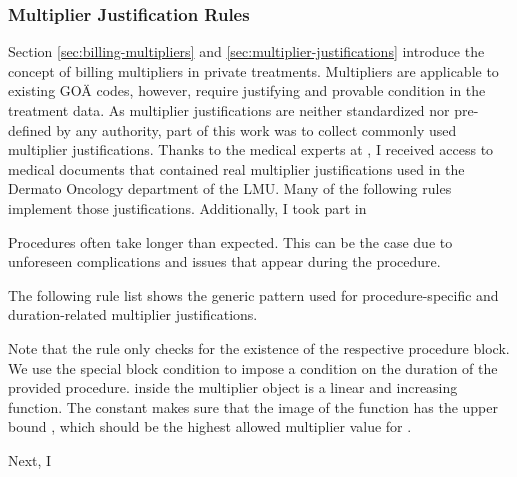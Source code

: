 \subsubsection{Multiplier Justification Rules}\label{subsec:multiplier-justification-rules}
Section \ref{sec:billing-multipliers} and \ref{sec:multiplier-justifications} introduce the concept of billing multipliers in private treatments.
Multipliers are applicable to existing GOÄ codes, however, require justifying and provable condition in the treatment data.
As multiplier justifications are neither standardized nor pre-defined by any authority,
part of this work was to collect commonly used multiplier justifications.
Thanks to the medical experts at \AV, I received access to medical documents that contained real multiplier justifications used in the Dermato Oncology department of the LMU.
Many of the following rules implement those justifications.
Additionally, I took part in 


Procedures often take longer than expected.
This can be the case due to unforeseen complications and issues that appear during the procedure.

The following rule list shows the generic pattern used for procedure-specific and duration-related multiplier justifications.



Note that the rule only checks for the existence of the respective procedure block.
We use the special block condition  to impose a condition on the duration of the provided procedure.
 inside the multiplier object is a linear and increasing function.
The constant makes sure that the image of the function has the upper bound , which should be the highest allowed multiplier value for .




Next, I

